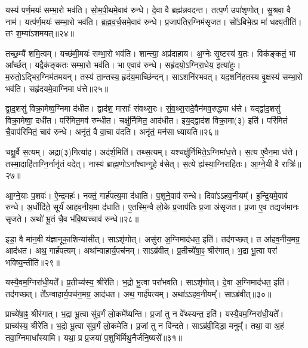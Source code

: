 यस्य॑ पर्ण॒मयः॑ सम्भा॒रो भव॑ति।
सो॒म॒पी॒थमे॒वाव॑ रुन्धे।
दे॒वा वै ब्रह्म॑न्नवदन्त।
तत्प॒र्ण उपा॑शृणोत्।
सु॒श्रवा॒ वै नाम॑।
यत्प॑र्ण॒मयः॑ सम्भा॒रो भव॑ति।
ब्र॒ह्म॒व॒र्च॒समे॒वाव॑ रुन्धे।
प्र॒जा\-प॑तिर॒ग्निम॑\-सृजत।
सो॑ऽबिभे॒त्प्र मा॑ धक्ष्य॒तीति॑।
तꣳ श॒म्या॑\-ऽशमयत्॥२४॥

तच्छ॒म्यै॑ शमि॒त्वम्।
यच्छ॑मी॒मयः॑ सम्भा॒रो भव॑ति।
शान्त्या॒ अप्र॑दाहाय।
अ॒ग्नेः सृ॒ष्टस्य॑ य॒तः।
विक॑ङ्कतं॒ भा आ᳚र्च्छत्।
यद्वैक॑ङ्कतः सम्भा॒रो भव॑ति।
भा ए॒वाव॑ रुन्धे।
सहृ॑दयो॒\-ऽग्निरा॒धेय॒ इत्या॑हुः।
म॒रुतो॒\-ऽद्भिर॒ग्निम॑तमयन्।
तस्य॑ ता॒न्तस्य॒ हृद॑य॒माच्छि॑न्दन्।
साऽशनि॑रभवत्।
यद॒शनि॑हतस्य वृ॒क्षस्य॑ सम्भा॒रो भव॑ति।
सहृ॑दयमे॒वाग्निमा ध॑त्ते॥२५॥

द्वा॒द॒शसु॑ विक्रा॒मेष्व॒ग्निमा द॑धीत।
द्वाद॑श॒ मासाः᳚ संवथ्स॒रः।
सं॒व॒थ्स॒रादे॒वैन॑मव॒रुद्ध्या ध॑त्ते।
यद्द्वा॑द॒शसु॑ विक्रा॒मेष्वा॒ दधी॑त।
परि॑मित॒मव॑ रुन्धीत।
चक्षु॑र्निमित॒ आद॑धीत।
इय॒द्द्वाद॑श विक्रा॒मा(३) इति॑।
परि॑मितं चै॒वाप॑रिमितं॒ चाव॑ रुन्धे।
अनृ॑तं॒ वै वा॒चा व॑दति।
अनृ॑तं॒ मन॑सा ध्यायति॥२६॥

चक्षु॒र्वै स॒त्यम्।
अद्रा(३)गित्या॑ह।
अद॑र्\mbox{}श॒मिति॑।
तथ्स॒त्यम्।
यश्चक्षु॑र्निमिते॒\-ऽग्निमा॑ध॒त्ते।
स॒त्य ए॒वैन॒मा ध॑त्ते।
तस्मा॒दाहि॑ताग्नि॒र्नानृ॑तं वदेत्।
नास्य॑ ब्राह्म॒णो\-ऽना᳚श्वान्गृ॒हे व॑सेत्।
स॒त्ये ह्य॑स्या॒ग्निराहि॑तः।
आ॒ग्ने॒यी वै रात्रिः॑॥२७॥

आ॒ग्ने॒याः प॒शवः॑।
ऐ॒न्द्रमहः॑।
नक्तं॒ गार्\mbox{}ह॑पत्य॒मा द॑धाति।
प॒शूने॒वाव॑ रुन्धे।
दिवा॑ऽऽहव॒नीयम्᳚।
इ॒न्द्रि॒यमे॒वाव॑ रुन्धे।
अ॒र्धोदि॑ते॒ सूर्य॑ आहव॒नीय॒मा द॑धाति।
ए॒तस्मि॒न्वै लो॒के प्र॒जा\-प॑तिः प्र॒जा अ॑\-सृजत।
प्र॒जा ए॒व तद्यज॑मानः \-सृजते।
अथो॑ भू॒तं चै॒व भ॑वि॒ष्यच्चाव॑ रुन्धे॥२८॥

इडा॒ वै मा॑न॒वी य॑ज्ञानूका॒शिन्या॑सीत्।
साऽशृ॑णोत्।
असु॑रा अ॒ग्निमाद॑धत॒ इति॑।
तद॑गच्छत्।
त आ॑हव॒नीय॒मग्र॒ आद॑धत।
अथ॒ गार्\mbox{}ह॑पत्यम्।
अथा᳚न्वाहार्य॒पच॑नम्।
साऽब्र॑वीत्।
प्र॒तीच्ये॑षा॒ꣴ॒ श्रीर॑गात्।
भ॒द्रा भू॒त्वा परा॑ भविष्य॒न्तीति॑॥२९॥

यस्यै॒वम॒ग्निरा॑धी॒यते᳚।
प्र॒तीच्य॑स्य॒ श्रीरे॑ति।
भ॒द्रो भू॒त्वा परा॑भवति।
साऽशृ॑णोत्।
दे॒वा अ॒ग्निमाद॑धत॒ इति॑।
तद॑गच्छत्।
ते᳚ऽन्वाहार्य॒पच॑न॒मग्र॒ आद॑धत।
अथ॒ गार्\mbox{}ह॑पत्यम्।
अथा॑ऽऽहव॒नी\-यम्᳚।
साऽब्र॑वीत्॥३०॥

प्राच्ये॑षा॒ꣴ॒ श्रीर॑गात्।
भ॒द्रा भू॒त्वा सु॑व॒र्गं लो॒कमे᳚ष्यन्ति।
प्र॒जां तु न वे᳚थ्स्यन्त॒ इति॑।
यस्यै॒वम॒ग्निरा॑धी॒यते᳚।
प्राच्य॑स्य॒ श्रीरे॑ति।
भ॒द्रो भू॒त्वा सु॑व॒र्गं लो॒कमे॑ति।
प्र॒जां तु न वि॑न्दते।
साऽब्र॑वी॒दिडा॒ मनुम्᳚।
तथा॒ वा अ॒हं तवा॒ग्निमाधा᳚स्यामि।
यथा॒ प्र प्र॒जया॑ प॒शुभि॑र्मिथु॒नैर्ज॑नि॒ष्यसे᳚॥३१॥

